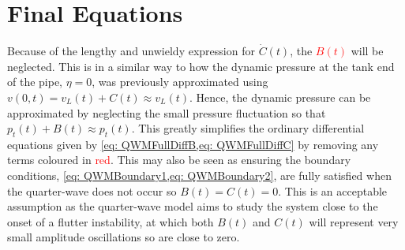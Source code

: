 


%

\section{Final Equations} \label{subsec: QWMFinalDimensional}


Because of the lengthy and unwieldy expression for $\dot{C}(t)$, the \textcolor{Red}{$B(t)$} will be neglected. This is in a similar way to how the dynamic pressure at the tank end of the pipe, $\eta = 0$, was previously approximated using $v(0,t) = v_L(t) + C(t) \approx v_L(t)$. Hence, the dynamic pressure can be approximated by neglecting the small pressure fluctuation so that $p_t(t) + B(t) \approx p_t(t)$. This greatly simplifies the ordinary differential equations given by \cref{eq: QWMFullDiffB,eq: QWMFullDiffC} by removing any terms coloured in \textcolor{Red}{red}. This may also be seen as ensuring the boundary conditions, \cref{eq: QWMBoundary1,eq: QWMBoundary2}, are fully satisfied when the quarter-wave does not occur so $B(t) = C(t) = 0$. This is an acceptable assumption as the quarter-wave model aims to study the system close to the onset of a flutter instability, at which both $B(t)$ and $C(t)$ will represent very small amplitude oscillations so are close to zero.

